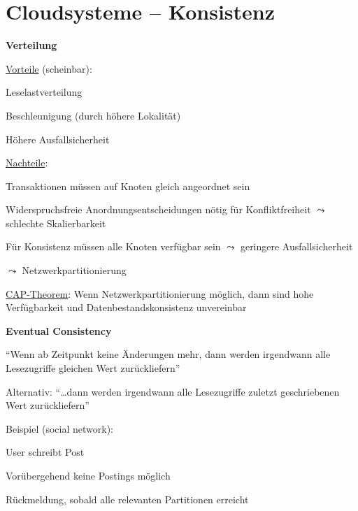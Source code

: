 \section{Cloudsysteme -- Konsistenz}
\label{sec:cloudkonsistenz}

\textbf{Verteilung}
\begin{items}
	\item \underline{Vorteile} (scheinbar):
	\begin{enumeration}
		\item Leselastverteilung
		\item Beschleunigung (durch höhere Lokalität)
		\item Höhere Ausfallsicherheit
	\end{enumeration}
	\item \underline{Nachteile}:
	\begin{enumeration}
		\item Transaktionen müssen auf Knoten gleich angeordnet sein
		\item Widerspruchsfreie Anordnungsentscheidungen nötig für Konfliktfreiheit \( \leadsto \) schlechte Skalierbarkeit
		\item Für Konsistenz müssen alle Knoten verfügbar sein \( \leadsto \) geringere Ausfallsicherheit
	\end{enumeration}
	\item \( \leadsto \) Netzwerkpartitionierung
	\item \underline{CAP-Theorem}: Wenn Netzwerkpartitionierung möglich, dann sind hohe Verfügbarkeit und Datenbestandskonsistenz unvereinbar
\end{items}

\textbf{Eventual Consistency}
\begin{items}
	\item ``Wenn ab Zeitpunkt keine Änderungen mehr, dann werden irgendwann alle Lesezugriffe gleichen Wert zurückliefern''
	\item Alternativ: ``\dots dann werden irgendwann alle Lesezugriffe zuletzt geschriebenen Wert zurückliefern''
	\item Beispiel (social network):
	\begin{enumeration}
		\item User schreibt Post
		\item Vorübergehend keine Postings möglich
		\item Rückmeldung, sobald alle relevanten Partitionen erreicht
	\end{enumeration}
\end{items}

